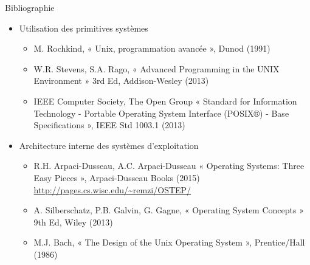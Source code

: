 \begin {frame} {Bibliographie}

    \begin {itemize}
	\item Utilisation des primitives systèmes
	    \begin {itemize}
		\fC
		\item M. Rochkind, « Unix, programmation avancée »,
		    Dunod (1991)

		\item W.R. Stevens, S.A. Rago, « Advanced Programming
		    in the UNIX Environment » 3rd Ed, Addison-Wesley
		    (2013)

		\item IEEE Computer Society, The Open Group « Standard
		    for Information Technology - Portable Operating
		    System Interface (POSIX®) - Base Specifications »,
		    IEEE Std 1003.1 (2013)

	    \end {itemize}
	\item Architecture interne des systèmes d'exploitation
	    \begin {itemize}
		\fC
		\item R.H. Arpaci-Dusseau, A.C. Arpaci-Dusseau 
		    « Operating Systems: Three Easy Pieces »,
		    Arpaci-Dusseau Books (2015)
		    \url {http://pages.cs.wisc.edu/~remzi/OSTEP/}

		\item A. Silberschatz, P.B. Galvin, G. Gagne,
		    « Operating System Concepts » 9th Ed, Wiley (2013)

		\item M.J. Bach, « The Design of the Unix Operating
		    System », Prentice/Hall (1986)

	    \end {itemize}
    \end {itemize}

\end {frame}



